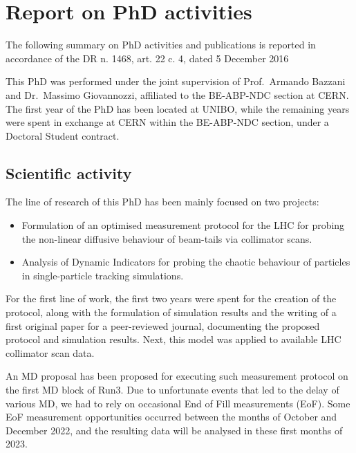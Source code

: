 \chapter*{Report on PhD activities}
\sectionmark{}

\noindent\textsf{The following summary on PhD activities and publications is reported in accordance of the DR n. 1468, art. 22 c. 4, dated 5 December 2016}

\vspace{3em}

This PhD was performed under the joint supervision of Prof.~Armando Bazzani and Dr.~Massimo Giovannozzi, affiliated to the BE-ABP-NDC section at CERN. The first year of the PhD has been located at UNIBO, while the remaining years were spent in exchange at CERN within the BE-ABP-NDC section, under a Doctoral Student contract.

\section*{Scientific activity}

The line of research of this PhD has been mainly focused on two projects:
\begin{itemize}
    \item Formulation of an optimised measurement protocol for the LHC for
probing the non-linear diffusive behaviour of beam-tails via collimator
scans.
    \item Analysis of Dynamic Indicators for probing the chaotic behaviour of particles
in single-particle tracking simulations.
\end{itemize}

For the first line of work, the first two years were spent for the creation of the protocol, along with the formulation of simulation results and the writing of a first original paper for a peer-reviewed journal, documenting the proposed protocol and simulation results. Next, this
model was applied to available LHC collimator scan data.

An MD proposal has been proposed for executing such measurement
protocol on the first MD block of Run3. Due to unfortunate events that led to
the delay of various MD, we had to rely on occasional End of Fill
measurements (EoF). Some EoF measurement opportunities occurred between the months of October and December 2022, and the resulting data will be analysed in these first months of 2023.

